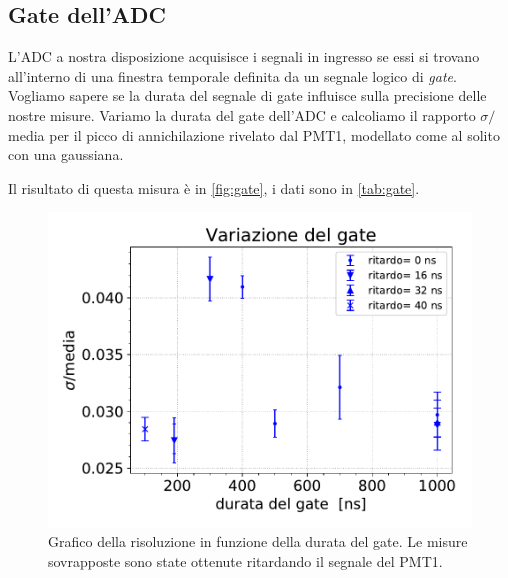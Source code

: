 \subsection{Gate dell'ADC}

L'ADC a nostra disposizione acquisisce i segnali in ingresso se essi si trovano all'interno di una finestra temporale definita da un segnale logico di \emph{gate}.
Vogliamo sapere se la durata del segnale di gate influisce sulla precisione delle nostre misure.
Variamo la durata del gate dell'ADC e calcoliamo il rapporto $\sigma\!/$\!media per il picco di annichilazione rivelato dal PMT1, modellato come al solito con una gaussiana.

Il risultato di questa misura è in \autoref{fig:gate}, i dati sono in \autoref{tab:gate}.

\begin{figure}[h]
\centering
\includegraphics[width=20 em]{immagini/gate}
\caption{Grafico della risoluzione in funzione della durata del gate. Le misure sovrapposte sono state ottenute ritardando il segnale del PMT1.}
\label{fig:gate}
\end{figure}

